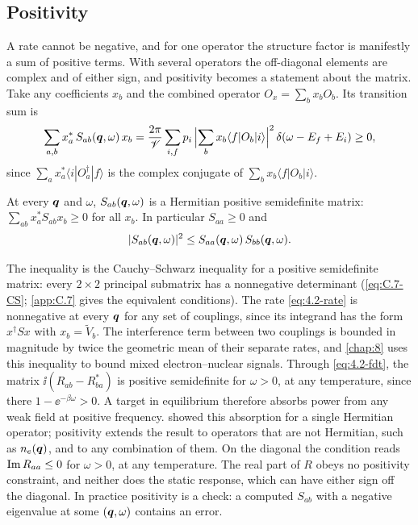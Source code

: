 \subsection{Positivity}

A rate cannot be negative, and for one operator the structure factor is manifestly a sum of positive terms. With several operators the off-diagonal elements are complex and of either sign, and positivity becomes a statement about the matrix. Take any coefficients $x_b$ and the combined operator $O_x = \sum_bx_bO_b$. Its transition sum is
\begin{equation*}
  \sum_{a,b}x_a^*\,S_{ab}(\bm{q},\omega)\,x_b = \frac{2\pi}{\mathscr{V}}\sum_{i,f}p_i\,\Bigl|\sum_bx_b\langle f|O_b|i\rangle\Bigr|^2\,\delta(\omega - E_f + E_i) \ge 0 ,
\end{equation*}
since $\sum_ax_a^*\langle i|O_a^\dagger|f\rangle$ is the complex conjugate of $\sum_bx_b\langle f|O_b|i\rangle$.
\begin{keyresult}
At every $\bm{q}$ and $\omega$, $S_{ab}(\bm{q},\omega)$ is a Hermitian positive semidefinite matrix: $\sum_{ab}x_a^*S_{ab}x_b \ge 0$ for all $x_b$. In particular $S_{aa} \ge 0$ and
\begin{equation}
  |S_{ab}(\bm{q},\omega)|^2 \le S_{aa}(\bm{q},\omega)\,S_{bb}(\bm{q},\omega) .
  \label{eq:4.2-positivity}
\end{equation}
\end{keyresult}
The inequality is the Cauchy--Schwarz inequality for a positive semidefinite matrix: every $2\times2$ principal submatrix has a nonnegative determinant (\cref{eq:C.7-CS}; \cref{app:C.7} gives the equivalent conditions). The rate \cref{eq:4.2-rate} is nonnegative at every $\bm{q}$ for any set of couplings, since its integrand has the form $x^\dagger Sx$ with $x_b = \tilde V_b$. The interference term between two couplings is bounded in magnitude by twice the geometric mean of their separate rates, and \cref{chap:8} uses this inequality to bound mixed electron--nuclear signals. Through \cref{eq:4.2-fdt}, the matrix $\ii(R_{ab} - R_{ba}^*)$ is positive semidefinite for $\omega > 0$, at any temperature, since there $1 - \ee^{-\beta\omega} > 0$. A target in equilibrium therefore absorbs power from any weak field at positive frequency.  showed this absorption for a single Hermitian operator; positivity extends the result to operators that are not Hermitian, such as $n_e(\bm{q})$, and to any combination of them. On the diagonal the condition reads $\operatorname{Im} R_{aa} \le 0$ for $\omega > 0$, at any temperature. The real part of $R$ obeys no positivity constraint, and neither does the static response, which can have either sign off the diagonal. In practice positivity is a check: a computed $S_{ab}$ with a negative eigenvalue at some $(\bm{q},\omega)$ contains an error.

